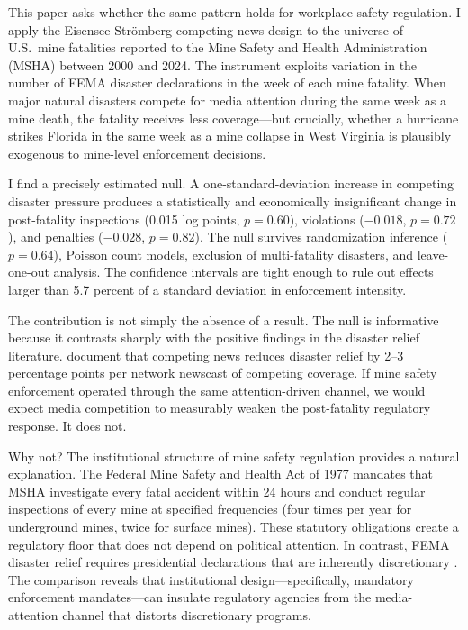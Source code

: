 \documentclass[12pt]{article}
\begin{document}
This paper asks whether the same pattern holds for workplace safety regulation. I apply the Eisensee-Str\"{o}mberg competing-news design to the universe of U.S.\ mine fatalities reported to the Mine Safety and Health Administration (MSHA) between 2000 and 2024. The instrument exploits variation in the number of FEMA disaster declarations in the week of each mine fatality. When major natural disasters compete for media attention during the same week as a mine death, the fatality receives less coverage---but crucially, whether a hurricane strikes Florida in the same week as a mine collapse in West Virginia is plausibly exogenous to mine-level enforcement decisions.

I find a precisely estimated null. A one-standard-deviation increase in competing disaster pressure produces a statistically and economically insignificant change in post-fatality inspections (0.015 log points, $p = 0.60$), violations ($-0.018$, $p = 0.72$), and penalties ($-0.028$, $p = 0.82$). The null survives randomization inference ($p = 0.64$), Poisson count models, exclusion of multi-fatality disasters, and leave-one-out analysis. The confidence intervals are tight enough to rule out effects larger than 5.7 percent of a standard deviation in enforcement intensity.

The contribution is not simply the absence of a result. The null is informative because it contrasts sharply with the positive findings in the disaster relief literature. \citet{eisensee2007news} document that competing news reduces disaster relief by 2--3 percentage points per network newscast of competing coverage. If mine safety enforcement operated through the same attention-driven channel, we would expect media competition to measurably weaken the post-fatality regulatory response. It does not.

Why not? The institutional structure of mine safety regulation provides a natural explanation. The Federal Mine Safety and Health Act of 1977 mandates that MSHA investigate every fatal accident within 24 hours and conduct regular inspections of every mine at specified frequencies (four times per year for underground mines, twice for surface mines). These statutory obligations create a regulatory floor that does not depend on political attention. In contrast, FEMA disaster relief requires presidential declarations that are inherently discretionary \citep{eisensee2007news}. The comparison reveals that institutional design---specifically, mandatory enforcement mandates---can insulate regulatory agencies from the media-attention channel that distorts discretionary programs.
\end{document}
